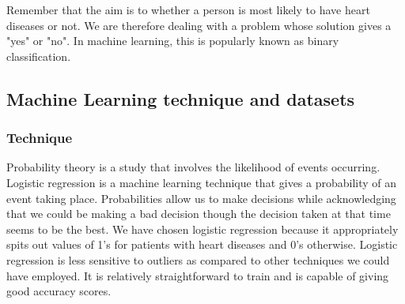 Remember that the aim is to whether a person is most likely to have heart diseases or not. We are therefore dealing with a problem whose solution gives a "yes" or "no". In machine learning, this is popularly known as binary classification.  

\subsection{Machine Learning technique and datasets}
\subsubsection{Technique}
Probability theory is a study that involves the likelihood of events occurring. Logistic regression is a machine learning technique that gives a probability of an event taking place. Probabilities allow us to make decisions while acknowledging that we could be making a bad decision though the decision taken at that time seems to be the best. We have chosen logistic regression because it appropriately spits out values of 1's for patients with heart diseases and 0's otherwise. Logistic regression is less sensitive to outliers as compared to other techniques we could have employed. It is relatively straightforward to train and is capable of giving good accuracy scores.

